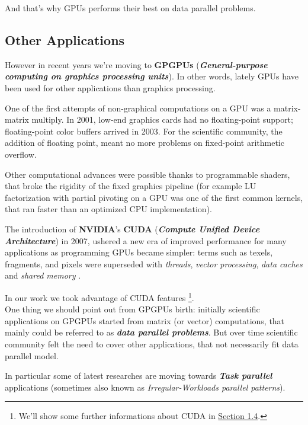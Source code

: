	And that's why GPUs performs their best on data parallel problems. 

\subsection{Other Applications}
\label{subs:otherApps}
	However in recent years we're moving to \textbf{GPGPUs} (\textbf{\textit{General-purpose computing on graphics processing units}}).
	In other words, lately GPUs have been used for other applications than graphics processing.
	
	
	One of the first attempts of non-graphical computations on a GPU was a matrix-matrix multiply. In 2001, low-end graphics cards had no floating-point support; floating-point color buffers arrived in 2003.
	For the scientific community, the addition of floating point, meant no more problems on fixed-point arithmetic overflow. 
	
	Other computational advances were possible thanks to programmable shaders, that broke the rigidity of the fixed graphics pipeline (for example LU factorization with partial pivoting on a GPU was one of the first common kernels, that ran faster than an optimized CPU implementation).
	
	The introduction of \textbf{NVIDIA}’s \textbf{CUDA} (\textbf{\textit{Compute Unified Device Architecture}}) in 2007, ushered a new era of improved performance for many applications as programming GPUs became simpler: terms such as texels, fragments, and pixels were superseded with \textit{threads}, \textit{vector processing}, \textit{data caches} and \textit{shared memory} \cite{fromCUtoOCL}. 
	
	In our work we took advantage of CUDA features  \footnote{We'll show some further informations about CUDA in \hyperref[sect:tools]{Section 1.4}.}. \\
	
	One thing we should point out from GPGPUs birth: initially scientific applications on GPGPUs started from matrix (or vector) computations, that mainly could be referred to as \textbf{\textit{data parallel problems}}.
	But over time scientific community felt the need to cover other applications, that not necessarily fit data parallel model.
	
	In particular some of latest researches are moving towards \textbf{\textit{Task parallel}} applications (sometimes also known as \textit{Irregular-Workloads parallel patterns}).\\
	
